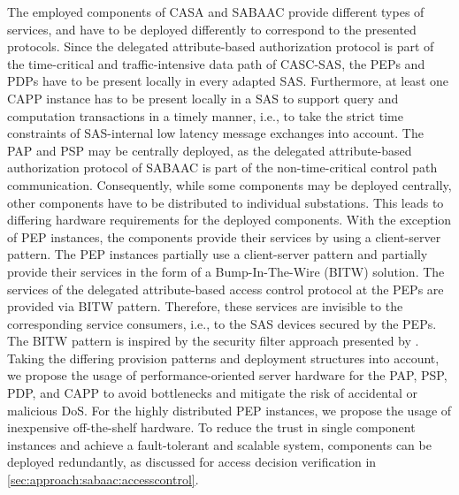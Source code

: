 The employed components of CASA and SABAAC provide different types of services, and have to be deployed differently to correspond to the presented protocols.
Since the delegated attribute-based authorization protocol is part of the time-critical and traffic-intensive data path of CASC-SAS, the PEPs and PDPs have to be present locally in every adapted SAS.
Furthermore, at least one CAPP instance has to be present locally in a SAS to support query and computation transactions in a timely manner, i.e., to take the strict time constraints of SAS-internal low latency message exchanges into account.
The PAP and PSP may be centrally deployed, as the delegated attribute-based authorization protocol of SABAAC is part of the non-time-critical control path communication.
Consequently, while some components may be deployed centrally, other components have to be distributed to individual substations.
This leads to differing hardware requirements for the deployed components.
With the exception of PEP instances, the components provide their services by using a client-server pattern.
The PEP instances partially use a client-server pattern and partially provide their services in the form of a Bump-In-The-Wire (BITW) solution.
The services of the delegated attribute-based access control protocol at the PEPs are provided via BITW pattern.
Therefore, these services are invisible to the corresponding service consumers, i.e., to the SAS devices secured by the PEPs.
The BITW pattern is inspired by the security filter approach presented by \citeauthor{Ishchenko2018} \cite{Ishchenko2018}.
Taking the differing provision patterns and deployment structures into account, we propose the usage of performance-oriented server hardware for the PAP, PSP, PDP, and CAPP to avoid bottlenecks and mitigate the risk of accidental or malicious DoS.
For the highly distributed PEP instances, we propose the usage of inexpensive off-the-shelf hardware.
To reduce the trust in single component instances and achieve a fault-tolerant and scalable system, components can be deployed redundantly, as discussed for access decision verification in \autoref{sec:approach:sabaac:accesscontrol}.
